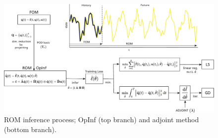 \begin{figure}[h!]\centering
    \includegraphics[width=.99\textwidth]{figures/intro_scheme.pdf}
    \caption{ROM inference process; OpInf (top branch) and adjoint method (bottom branch).}
    \label{fig:intro_rom1}
\end{figure}
    








 













